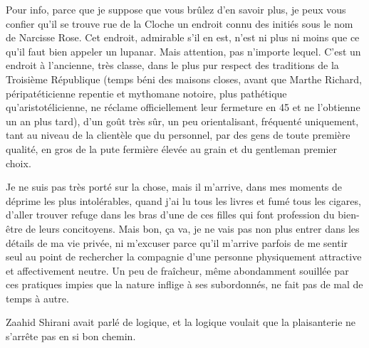 %
%
Pour info, parce que je suppose que vous brûlez d’en savoir plus, je peux vous confier qu’il se trouve rue de la Cloche un endroit connu des initiés sous le nom de Narcisse Rose. Cet endroit, admirable s’il en est, n’est ni plus ni moins que ce qu’il faut bien appeler un lupanar. Mais attention, pas n’importe lequel. \label{rat:6}C’est un endroit à l’ancienne, très classe, dans le plus pur respect des traditions de la Troisième République (temps béni des maisons closes, avant que Marthe Richard, péripatéticienne repentie et mythomane notoire, plus pathétique qu’aristotélicienne, ne réclame officiellement leur fermeture en 45 et ne l’obtienne un an plus tard), d’un goût très sûr, un peu orientalisant, fréquenté uniquement, tant au niveau de la clientèle que du personnel, par des gens de toute première qualité, en gros de la pute fermière élevée au grain et du gentleman premier choix. 

Je ne suis pas très porté sur la chose, mais il m’arrive, dans mes moments de déprime les plus intolérables, quand j’ai lu tous les livres et fumé tous les cigares, d’aller trouver refuge dans les bras d’une de ces filles qui font profession du bien-être de leurs concitoyens. Mais bon, ça va, je ne vais pas non plus entrer dans les détails de ma vie privée, ni m’excuser parce qu’il m’arrive parfois de me sentir seul au point de rechercher la compagnie d’une personne physiquement attractive et affectivement neutre. Un peu de fraîcheur, même abondamment souillée par ces pratiques impies que la nature inflige à ses subordonnés, ne fait pas de mal de temps à autre.

Zaahid Shirani avait parlé de logique, et la logique voulait que la plaisanterie ne s’arrête pas en si bon chemin.

